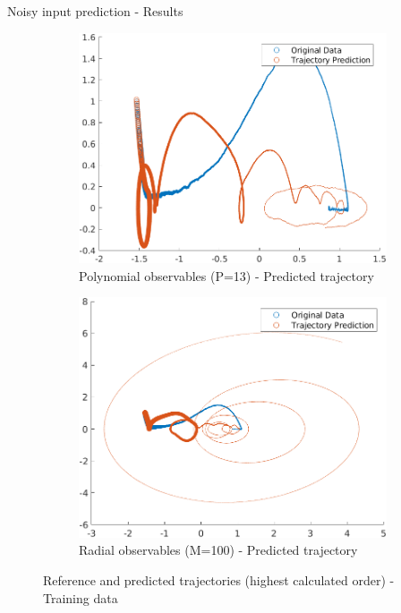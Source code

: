 \documentclass{beamer}
\begin{document}
\begin{frame}{Noisy input prediction - Results}
    \begin{figure}
        \centering
        \begin{subfigure}[b]{0.45\textwidth}
            \centering
            \includegraphics[width=\textwidth]{Training_Poly.png}
            \caption{Polynomial observables (P=13) - Predicted trajectory}
            \label{fig:training_poly}
        \end{subfigure}
        \hfill
        \begin{subfigure}[b]{0.45\textwidth}
            \centering
            \includegraphics[width=\textwidth]{Training_Radial.png}
            \caption{Radial observables (M=100) - Predicted trajectory}
            \label{fig:training_radial}
        \end{subfigure}
        \caption{Reference and predicted trajectories (highest calculated order) - Training data}
    \end{figure}
\end{frame}
\end{document}
